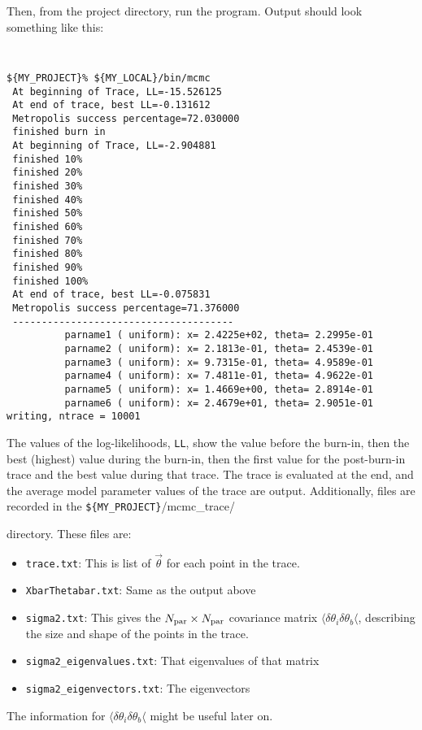 \documentclass[UserManual.tex]{subfiles}
\begin{document}
{Then, from the project directory, run the program. Output should look something like this:
{\tt
\begin{verbatim}
${MY_PROJECT}% ${MY_LOCAL}/bin/mcmc
 At beginning of Trace, LL=-15.526125
 At end of trace, best LL=-0.131612
 Metropolis success percentage=72.030000
 finished burn in
 At beginning of Trace, LL=-2.904881
 finished 10%
 finished 20%
 finished 30%
 finished 40%
 finished 50%
 finished 60%
 finished 70%
 finished 80%
 finished 90%
 finished 100%
 At end of trace, best LL=-0.075831
 Metropolis success percentage=71.376000
 --------------------------------------
          parname1 ( uniform): x= 2.4225e+02, theta= 2.2995e-01
          parname2 ( uniform): x= 2.1813e-01, theta= 2.4539e-01
          parname3 ( uniform): x= 9.7315e-01, theta= 4.9589e-01
          parname4 ( uniform): x= 7.4811e-01, theta= 4.9622e-01
          parname5 ( uniform): x= 1.4669e+00, theta= 2.8914e-01
          parname6 ( uniform): x= 2.4679e+01, theta= 2.9051e-01
writing, ntrace = 10001
\end{verbatim}}
The values of the log-likelihoods, {\tt LL}, show the value before the burn-in, then the best (highest) value during the burn-in, then the first value for the post-burn-in trace and the best value during that trace. The trace is evaluated at the end, and the average model parameter values of the trace are output. Additionally, files are recorded in the {\tt \$\{MY\_PROJECT\}}/mcmc\_trace/} directory. These files are:
\begin{itemize}\itemsep=0pt
\item {\tt trace.txt}: This is list of $\vec{\theta}$ for each point in the trace.
\item {\tt XbarThetabar.txt}: Same as the output above
\item {\tt sigma2.txt}: This gives the $N_{\rm par}\times N_{\rm par}$ covariance matrix $\langle\delta \theta_i\delta\theta_{b}\langle$, describing the size and shape of the points in the trace.
\item {\tt sigma2\_eigenvalues.txt}: That eigenvalues of that matrix
\item {\tt sigma2\_eigenvectors.txt}: The eigenvectors
\end{itemize}
The information for $\langle\delta \theta_i\delta\theta_{b}\langle$ might be useful later on.
\end{document}

